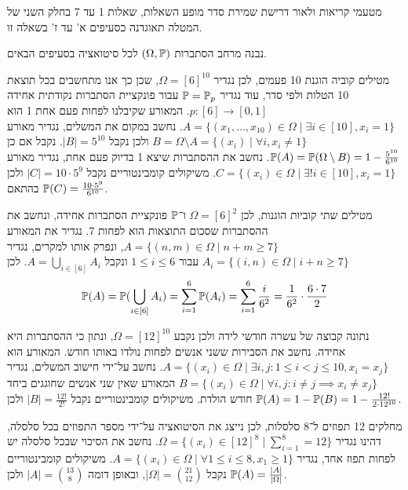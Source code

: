 \Question{}
מטעמי קריאות ולאור דרישת שמירת סדר מופע השאלות, שאלות 1 עד 7 בחלק השני של המטלה תאוגדנה כסעיפים א' עד ז' בשאלה זו.

נבנה מרחב הסתברות $(\Omega, \mathbb{P})$ לכל סיטואציה בסעיפים הבאים.

\Subquestion{}
מטילים קוביה הוגנת 10 פעמים, לכן נגדיר $\Omega = {[6]}^{10}$, שכן כך אנו מתחשבים בכל תוצאת 10 הטלות ולפי סדר, עוד נגדיר $\mathbb{P} = \mathbb{P}_p$ עבור פונקציית הסתברות נקודתית אחידה $p : [6] \to [0, 1]$.
המאורע שקיבלנו לפחות פעם אחת 1 הוא $A = \{ (x_1, \dots, x_{10}) \in \Omega \mid \exists i \in [10], x_i = 1 \}$.
נחשב במקום את המשלים, נגדיר מאורע $B = \Omega \setminus A = \{ (x_i) \mid \forall i, x_i \ne 1 \}$ ולכן נקבל $|B| = 5^{10}$.
נקבל אם כן $\mathbb{P}(A) = \mathbb{P}(\Omega \setminus B) = 1 - \frac{5^{10}}{6^{10}}$.
נחשב את ההסתברות שיצא 1 בדיוק פעם אחת, נגדיר מאורע $C = \{ (x_i) \in \Omega \mid \exists ! i \in [10], x_i = 1 \}$.
משיקולים קומבינטוריים נקבל $|C| = 10 \cdot 5^9$ ולכן בהתאם $\mathbb{P}(C) = \frac{10 \cdot 5^9}{6^{10}}$.

\Subquestion{}
מטילים שתי קוביות הוגנות, לכן $\Omega = {[6]}^2$ ו־$\mathbb{P}$ פונקציית הסתברות אחידה, ונחשב את ההסתברות שסכום התוצאות הוא לפחות 7.
נגדיר את המאורע $A = \{ (n, m) \in \Omega \mid n + m \ge 7 \}$, ונפרק אותו למקרים, נגדיר $A_i = \{ (i, n) \in \Omega \mid i + n \ge 7 \}$ עבור $1 \le i \le 6$ ונקבל $A = \bigcup_{i \in [6]} A_i$.
לכן
\[
	\mathbb{P}(A) = \mathbb{P}(\bigcup_{i \in [6]} A_i)
	= \sum_{i = 1}^{6} \mathbb{P}(A_i)
	= \sum_{i = 1}^{6} \frac{i}{6^2}
	= \frac{1}{6^2} \cdot \frac{6 \cdot 7}{2}
\]

\Subquestion{}
נתונה קבוצה של עשרה חודשי לידה ולכן נקבע $\Omega = {[12]}^{10}$, ונתון כי ההסתברות היא אחידה.
נחשב את הסבירות ששני אנשים לפחות נולדו באותו חודש.
המאורע הוא $A = \{ (x_i) \in \Omega \mid \exists i, j : 1 \le i < j \le 10, x_i = x_j \}$.
נחשב על־ידי חישוב המשלים, נגדיר $B = \{ (x_i) \in \Omega \mid \forall i, j : i \ne j \implies x_i \ne x_j \}$ המאורע שאין שני אנשים שחוגגים ביחד חודש הולדת.
משיקולים קומבינטוריים נקבל $|B| = \frac{12!}{2!}$ ולכן $\mathbb{P}(A) = 1 - \mathbb{P}(B) = 1 - \frac{12!}{2 \cdot 12^{10}}$.

\Subquestion{}
מחלקים 12 תפוזים ל־8 סלסלות, לכן נייצג את הסיטואציה על־ידי מספר התפוזים בכל סלסלה, דהינו נגדיר $\Omega = \{ (x_i) \in {[12]}^8 \mid \sum_{i = 1}^{8} = 12 \}$.
נחשב את הסיכוי שבכל סלסלה יש לפחות תפוז אחד, נגדיר $A = \{ (x_i) \in \Omega \mid \forall 1 \le i \le 8, x_1 \ge 1 \}$.
משיקולים קומבינטוריים נקבל $|\Omega| = \binom{21}{12}$, ובאופן דומה $|A| = \binom{13}{8}$ ולכן $\mathbb{P}(A) = \frac{|A|}{|\Omega|}$.

